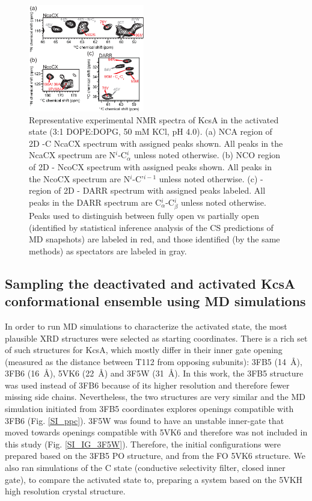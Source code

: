 \documentclass[%
 aip,
 amsmath,amssymb,
 preprint,%
]{revtex4-1}
\newcommand{\ca}{\ce{C_\alpha} }
\newcommand{\cb}{\ce{C_\beta} }
\begin{document}
\begin{figure}[tbp]
	\includegraphics[width=0.45\textwidth]{figures/KcsA_NCA_markers_v2.eps}
	 \caption{\label{fg:NMR_2D_markers}\scriptsize
    Representative experimental NMR spectra of KcsA in the activated state (3:1 DOPE:DOPG, 50 mM KCl, pH 4.0). (a) NCA region of 2D -C NcaCX spectrum with assigned peaks shown. All peaks in the NcaCX spectrum are N$^i$-C$_{\alpha}^i$ unless noted otherwise. (b) NCO region of 2D - NcoCX spectrum with assigned peaks shown. All peaks in the NcoCX spectrum are N$^i$-C’$^{i-1}$ unless noted otherwise. (c) \ca-\cb region of 2D - DARR spectrum with assigned peaks labeled. All peaks in the DARR spectrum are C$_{\alpha}^{i}$-C$_{\beta}^{i}$ unless noted otherwise. Peaks used to distinguish between fully open vs partially open (identified by statistical inference analysis of the CS predictions of MD snapshots) are labeled in red, and those identified (by the same methods) as spectators are labeled in gray.}
\end{figure}

\subsection{Sampling the deactivated and activated KcsA conformational ensemble using MD simulations}

In order to run MD simulations to characterize the activated state, the most plausible XRD structures were selected as starting coordinates. There is a rich set of such structures for KcsA, which mostly differ in their inner gate opening (measured as the distance between T112 \ca from opposing subunits): 3FB5 (\SI{14}{\angstrom}), 3FB6 (\SI{16}{\angstrom}), 5VK6 (\SI{22}{\angstrom}) and 3F5W (\SI{31}{\angstrom})\cite{Cuello2010,Cuello2017}. In this work, the 3FB5 structure was used instead of 3FB6 because of its higher resolution and therefore fewer missing side chains. Nevertheless, the two structures are very similar and the MD simulation initiated from 3FB5 coordinates explores  openings compatible with 3FB6 (Fig. \ref{SI_ppc}). 3F5W was found to have an unstable inner-gate that moved towards openings compatible with 5VK6 and therefore was not included in this study (Fig. \ref{SI_IG_3F5W}). Therefore, the initial configurations were prepared based on the 3FB5 PO structure, and from the FO 5VK6 structure. We also ran simulations of the C state (conductive selectivity filter, closed inner gate), to compare the activated state to, preparing a system based on the 5VKH high resolution crystal structure. 
\end{document}
